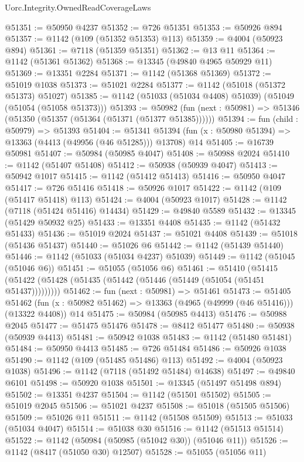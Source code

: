 \begin{lexlean}{Uorc.Integrity.OwnedReadCoverageLaws}
\begin{coremodule}
@51351 := @50950 @4237
@51352 := @726 @51351
@51353 := @50926 @894
@51357 := @1142 (@109 (@51352 @51353) @113)
@51359 := @4004 (@50923 @894)
@51361 := @7118 (@51359 @51351)
@51362 := @13 @11
@51364 := @1142 (@51361 @51362)
@51368 := @13345 (@49840 @4965 @50929 @11)
@51369 := @13351 @2284
@51371 := @1142 (@51368 @51369)
@51372 := @51019 @1038
@51373 := @51021 @2284
@51377 := @1142 (@51018 (@51372 @51373) @51027)
@51385 := @1142 (@51033 (@51034 @4408) @51039) (@51049 (@51054 (@51058 @51373)))
@51393 := @50982 (fun (next : @50981) => @51346 (@51350 (@51357 (@51364 (@51371 (@51377 @51385))))))
@51394 := fun (child : @50979) => @51393
@51404 := @51341 @51394 (fun (x : @50980 @51394) => @13363 (@4413 (@49956 (@46 @51285))) @13708) @14
@51405 := @16739 @50981
@51407 := @50984 (@50985 @4047)
@51408 := @50988 @2024
@51410 := @1142 (@51407 @51408)
@51412 := @50938 (@50939 @4047)
@51413 := @50942 @1017
@51415 := @1142 (@51412 @51413)
@51416 := @50950 @4047
@51417 := @726 @51416
@51418 := @50926 @1017
@51422 := @1142 (@109 (@51417 @51418) @113)
@51424 := @4004 (@50923 @1017)
@51428 := @1142 (@7118 (@51424 @51416) @14434)
@51429 := @49840 @5589
@51432 := @13345 (@51429 @50932 @25)
@51433 := @13351 @4408
@51435 := @1142 (@51432 @51433)
@51436 := @51019 @2024
@51437 := @51021 @4408
@51439 := @51018 (@51436 @51437)
@51440 := @51026 @6
@51442 := @1142 (@51439 @51440)
@51446 := @1142 (@51033 (@51034 @4237) @51039)
@51449 := @1142 (@51045 (@51046 @6))
@51451 := @51055 (@51056 @6)
@51461 := @51410
    (@51415 (@51422 (@51428 (@51435 (@51442 (@51446 (@51449 (@51054 (@51451 @51437)))))))))
@51462 := fun (next : @50981) => @51461
@51473 := @51405
    @51462
    (fun (x : @50982 @51462) => @13363 (@4965 (@49999 (@46 @51416))) (@13322 @4408))
    @14
@51475 := @50984 (@50985 @4413)
@51476 := @50988 @2045
@51477 := @51475 @51476
@51478 := @8412 @51477
@51480 := @50938 (@50939 @4413)
@51481 := @50942 @1038
@51483 := @1142 (@51480 @51481)
@51484 := @50950 @4413
@51485 := @726 @51484
@51486 := @50926 @1038
@51490 := @1142 (@109 (@51485 @51486) @113)
@51492 := @4004 (@50923 @1038)
@51496 := @1142 (@7118 (@51492 @51484) @14638)
@51497 := @49840 @6101
@51498 := @50920 @1038
@51501 := @13345 (@51497 @51498 @894)
@51502 := @13351 @4237
@51504 := @1142 (@51501 @51502)
@51505 := @51019 @2045
@51506 := @51021 @4237
@51508 := @51018 (@51505 @51506)
@51509 := @51026 @11
@51511 := @1142 (@51508 @51509)
@51513 := @51033 (@51034 @4047)
@51514 := @51038 @30
@51516 := @1142 (@51513 @51514)
@51522 := @1142 (@50984 (@50985 (@51042 @30)) (@51046 @11))
@51526 := @1142 (@8417 (@51050 @30) @12507)
@51528 := @51055 (@51056 @11)

\end{coremodule}
\end{lexlean}
